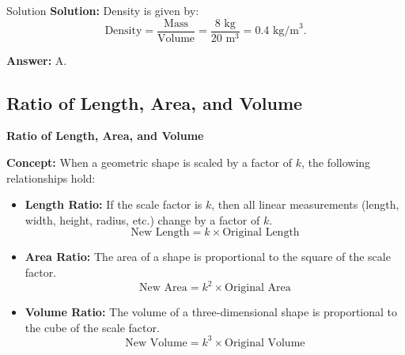 \documentclass{beamer}
\begin{document}
\begin{frame}{Solution}
\textbf{Solution:}  
Density is given by:
\[
\text{Density} = \frac{\text{Mass}}{\text{Volume}} = \frac{8 \text{ kg}}{20 \text{ m}^3} = 0.4 \text{ kg/m}^3.
\]

\textbf{Answer:} A.
\end{frame}




\begin{frame}
\section{Ratio of Length, Area, and Volume}
\end{frame}


\begin{frame}{\textbf{Ratio of Length, Area, and Volume}}

    \textbf{Concept:}  
    When a geometric shape is scaled by a factor of \( k \), the following relationships hold:

    \vspace{0.3cm}
    \begin{itemize}
        \item \textbf{Length Ratio:} If the scale factor is \( k \), then all linear measurements (length, width, height, radius, etc.) change by a factor of \( k \).
        \[
        \text{New Length} = k \times \text{Original Length}
        \]
        
        \item \textbf{Area Ratio:} The area of a shape is proportional to the square of the scale factor.
        \[
        \text{New Area} = k^2 \times \text{Original Area}
        \]

        \item \textbf{Volume Ratio:} The volume of a three-dimensional shape is proportional to the cube of the scale factor.
        \[
        \text{New Volume} = k^3 \times \text{Original Volume}
        \]
    \end{itemize}
\end{frame}
\end{document}
